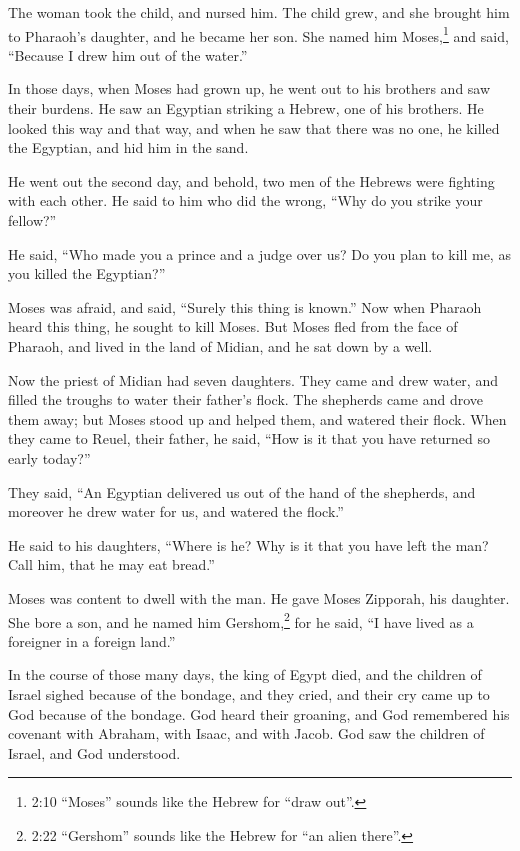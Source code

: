 The woman took the child, and nursed him. \myverse{}The child grew, and she brought him to Pharaoh’s daughter, and he became her son. She named him Moses,\footnote{2:10 “Moses” sounds like the Hebrew for “draw out”.} and said, “Because I drew him out of the water.”


\myverse{}In those days, when Moses had grown up, he went out to his brothers
and saw their burdens. He saw an Egyptian striking a Hebrew, one of his brothers. \myverse{}He looked this way and that way, and when he saw that there was no one, he killed the Egyptian, and hid him in the sand.


\myverse{}He went out the second day, and behold, two men of the Hebrews
were fighting with each other. He said to him who did the wrong, “Why do you strike your fellow?”


\myverse{}He said, “Who made you a prince and a judge over us? Do you plan
to kill me, as you killed the Egyptian?”

Moses was afraid, and said, “Surely this thing is known.” \myverse{}Now when Pharaoh heard this thing, he sought to kill Moses. But Moses fled from the face of Pharaoh, and lived in the land of Midian, and he sat down by a well.


\myverse{}Now the priest of Midian had seven daughters. They came and drew
water, and filled the troughs to water their father’s flock. \myverse{}The shepherds came and drove them away; but Moses stood up and helped them,
and watered their flock. \myverse{}When they came to Reuel, their father, he said, “How is it that you have returned so early today?”


\myverse{}They said, “An Egyptian delivered us out of the hand of the shepherds,
and moreover he drew water for us, and watered the flock.”


\myverse{}He said to his daughters, “Where is he? Why is it that you have
left the man? Call him, that he may eat bread.”


\myverse{}Moses was content to dwell with the man. He gave Moses Zipporah,
his daughter. \myverse{}She bore a son, and he named him Gershom,\footnote{2:22 “Gershom” sounds like the Hebrew for “an alien there”.} for he said, “I have lived as
a foreigner in a foreign land.”


\myverse{}In the course of those many days, the king of Egypt died, and
the children of Israel sighed because of the bondage, and they cried, and their cry came up to God because of the bondage. \myverse{}God heard their groaning, and God remembered his covenant with Abraham, with Isaac, and with Jacob. \myverse{}God saw the children of Israel, and God understood.


